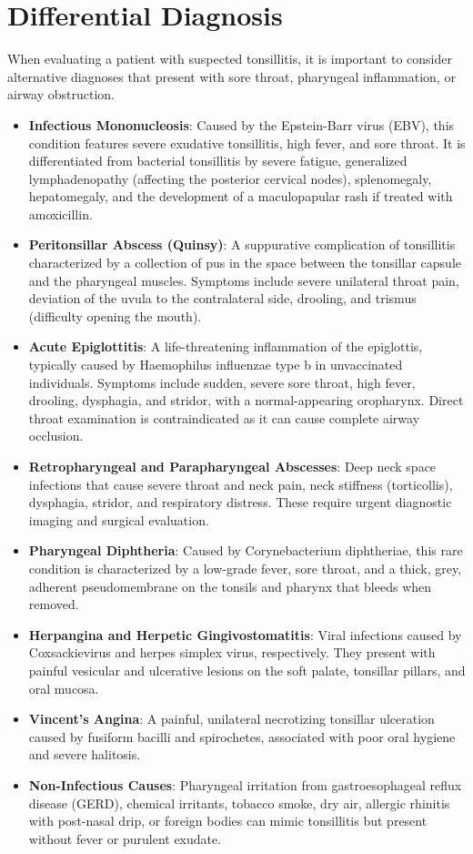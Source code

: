 \section*{Differential Diagnosis}
When evaluating a patient with suspected tonsillitis, it is important to consider alternative diagnoses that present with sore throat, pharyngeal inflammation, or airway obstruction.
\begin{itemize}
    \item \textbf{Infectious Mononucleosis}: Caused by the Epstein-Barr virus (EBV), this condition features severe exudative tonsillitis, high fever, and sore throat. It is differentiated from bacterial tonsillitis by severe fatigue, generalized lymphadenopathy (affecting the posterior cervical nodes), splenomegaly, hepatomegaly, and the development of a maculopapular rash if treated with amoxicillin.
    \item \textbf{Peritonsillar Abscess (Quinsy)}: A suppurative complication of tonsillitis characterized by a collection of pus in the space between the tonsillar capsule and the pharyngeal muscles. Symptoms include severe unilateral throat pain, deviation of the uvula to the contralateral side, drooling, and trismus (difficulty opening the mouth).
    \item \textbf{Acute Epiglottitis}: A life-threatening inflammation of the epiglottis, typically caused by Haemophilus influenzae type b in unvaccinated individuals. Symptoms include sudden, severe sore throat, high fever, drooling, dysphagia, and stridor, with a normal-appearing oropharynx. Direct throat examination is contraindicated as it can cause complete airway occlusion.
    \item \textbf{Retropharyngeal and Parapharyngeal Abscesses}: Deep neck space infections that cause severe throat and neck pain, neck stiffness (torticollis), dysphagia, stridor, and respiratory distress. These require urgent diagnostic imaging and surgical evaluation.
    \item \textbf{Pharyngeal Diphtheria}: Caused by Corynebacterium diphtheriae, this rare condition is characterized by a low-grade fever, sore throat, and a thick, grey, adherent pseudomembrane on the tonsils and pharynx that bleeds when removed.
    \item \textbf{Herpangina and Herpetic Gingivostomatitis}: Viral infections caused by Coxsackievirus and herpes simplex virus, respectively. They present with painful vesicular and ulcerative lesions on the soft palate, tonsillar pillars, and oral mucosa.
    \item \textbf{Vincent's Angina}: A painful, unilateral necrotizing tonsillar ulceration caused by fusiform bacilli and spirochetes, associated with poor oral hygiene and severe halitosis.
    \item \textbf{Non-Infectious Causes}: Pharyngeal irritation from gastroesophageal reflux disease (GERD), chemical irritants, tobacco smoke, dry air, allergic rhinitis with post-nasal drip, or foreign bodies can mimic tonsillitis but present without fever or purulent exudate.
\end{itemize}

